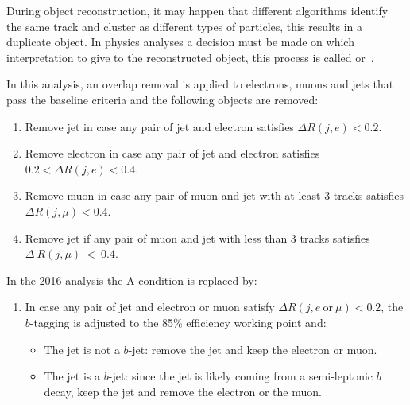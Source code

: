 During object reconstruction, it may happen that different algorithms identify
the same track and cluster as different types of particles, this results in a
duplicate object. In physics analyses a decision must be made on which
interpretation to give to the reconstructed object, this process is called
\gls{or}~\cite{Alison:1536507}.

In this analysis, an overlap removal is applied to electrons, muons and jets
that pass the baseline criteria and the following objects are removed:
\begin{enumerate}[A -]
\item Remove jet in case any pair of jet and electron satisfies
  $\Delta R(j, e) < 0.2$.
\item Remove electron in case any pair of jet and electron satisfies
  $0.2 < \Delta R(j, e) < 0.4$.
\item Remove muon in case any pair of muon and jet with at least 3 tracks
  satisfies $\Delta R(j, \mu) < 0.4$.
\item Remove jet if any pair of muon and jet with less than 3 tracks satisfies
  $\Delta~R(j, \mu)~<~0.4$.
\end{enumerate}
In the 2016 analysis the A condition is replaced by:
\begin{enumerate}[E -]
\item In case any pair of jet and electron or muon satisfy
  $\Delta R(j, e~\mathrm{or}~\mu ) < 0.2$, the $b$-tagging is adjusted to the 85\%
  efficiency working point and:
  \begin{itemize}
  \item The jet is not a $b$-jet: remove the jet and keep the electron or muon.
  \item The jet is a $b$-jet: since the jet is likely coming from a
    semi-leptonic $b$ decay, keep the jet and remove the electron or the muon.
  \end{itemize}
\end{enumerate}
